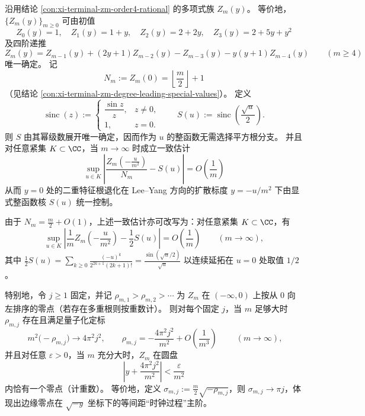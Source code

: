 
\begin{conclusion}[\texorpdfstring{$y=0$}{y=0} 的扩散 Lee--Yang 边缘：\texorpdfstring{$\operatorname{sinc}$}{sinc} 解析核与近零根量子化]\label{con:xi-terminal-zm-double-root-diffusive-sinc-limit}
沿用结论 \ref{con:xi-terminal-zm-order4-rational} 的多项式族 \(Z_m(y)\)。
等价地，\(\{Z_m(y)\}_{m\ge 0}\) 可由初值
\[
Z_0(y)=1,\quad
Z_1(y)=1+y,\quad
Z_2(y)=2+2y,\quad
Z_3(y)=2+5y+y^2
\]
及四阶递推
\[
Z_m(y)
=Z_{m-1}(y)+(2y+1)Z_{m-2}(y)-Z_{m-3}(y)-y(y+1)Z_{m-4}(y)
\qquad(m\ge 4)
\]
唯一确定。
记
\[
N_m:=Z_m(0)=\left\lfloor\frac m2\right\rfloor+1
\]
（见结论 \ref{con:xi-terminal-zm-degree-leading-special-values}）。
定义
\[
\operatorname{sinc}(z):=
\begin{cases}
\dfrac{\sin z}{z}, & z\neq 0,\\[1mm]
1, & z=0.
\end{cases}
\qquad
S(u):=\operatorname{sinc}\!\left(\frac{\sqrt u}{2}\right).
\]
则 \(S\) 由其幂级数展开唯一确定，因而作为 \(u\) 的整函数无需选择平方根分支。
并且对任意紧集 \(K\subset\CC\)，当 \(m\to\infty\) 时成立一致估计
\[
\boxed{\;
\sup_{u\in K}\left\lvert
\frac{Z_m\!\left(-\frac{u}{m^{2}}\right)}{N_m}-S(u)
\right\rvert=O\!\left(\frac1m\right)\;}
\]
从而 \(y=0\) 处的二重特征根退化在 Lee--Yang 方向的扩散标度 \(y=-u/m^2\) 下由显式整函数核 \(S(u)\) 统一控制。
\par
由于 \(N_m=\frac m2+O(1)\)，上述一致估计亦可改写为：对任意紧集 \(K\subset\CC\)，有
\[
\sup_{u\in K}\left\lvert
\frac{1}{m}Z_m\!\left(-\frac{u}{m^{2}}\right)-\frac12 S(u)
\right\rvert=O\!\left(\frac1m\right)
\qquad(m\to\infty),
\]
其中
\(
\frac12 S(u)=\sum_{k\ge 0}\frac{(-u)^k}{2^{2k+1}(2k+1)!}
=\frac{\sin(\sqrt{u}/2)}{\sqrt{u}}
\)
以连续延拓在 \(u=0\) 处取值 \(1/2\)。

特别地，令 \(j\ge 1\) 固定，并记 \(\rho_{m,1}>\rho_{m,2}>\cdots\) 为 \(Z_m\) 在 \((-\infty,0)\) 上按从 \(0\) 向左排序的零点（若存在多重根则按重数计）。
则对每个固定 \(j\)，当 \(m\) 足够大时 \(\rho_{m,j}\) 存在且满足量子化定标
\[
\boxed{\;
m^{2}\bigl(-\rho_{m,j}\bigr)\longrightarrow 4\pi^{2}j^{2},
\qquad
\rho_{m,j}=-\frac{4\pi^{2}j^{2}}{m^{2}}+O\!\left(\frac1{m^{3}}\right)\;}
\qquad(m\to\infty),
\]
并且对任意 \(\varepsilon>0\)，当 \(m\) 充分大时，\(Z_m\) 在圆盘
\[
\left|y+\frac{4\pi^2 j^2}{m^2}\right|<\frac{\varepsilon}{m^2}
\]
内恰有一个零点（计重数）。
等价地，定义 \(\sigma_{m,j}:=\frac{m}{2}\sqrt{-\rho_{m,j}}\)，则 \(\sigma_{m,j}\to \pi j\)，体现出边缘零点在 \(\sqrt{-y}\) 坐标下的等间距“时钟过程”主阶。
\end{conclusion}
